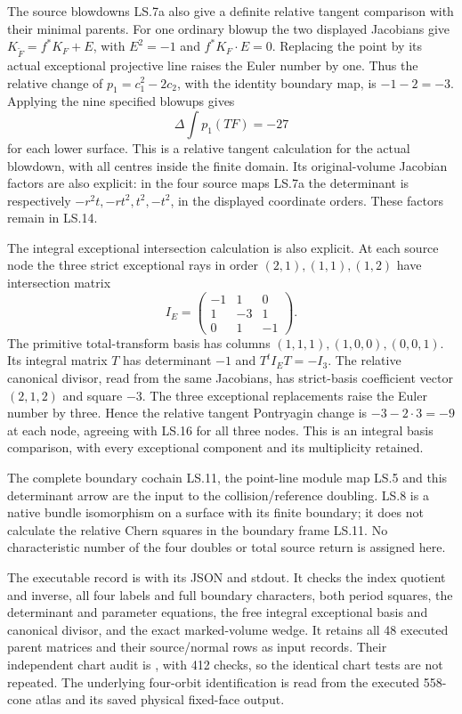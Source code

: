 The source blowdowns LS.7a also give a definite relative
tangent comparison with their minimal parents. For one
ordinary blowup the two displayed Jacobians give
\(K_{\widetilde F}=f^*K_F+E\), with \(E^2=-1\)
and \(f^*K_F\cdot E=0\). Replacing the point by its
actual exceptional projective line raises the Euler
number by one. Thus the relative change of
\(p_1=c_1^2-2c_2\), with the identity boundary map,
is \(-1-2=-3\). Applying the nine specified blowups
gives
\[
 \Delta\!\int p_1(TF)=-27
 \tag{LS.16}
\]
for each lower surface. This is a relative tangent
calculation for the actual blowdown, with all centres
inside the finite domain. Its original-volume
Jacobian factors are also explicit: in the four
source maps LS.7a the determinant is respectively
\(-r^2t, -rt^2, t^2,-t^2\), in the displayed
coordinate orders. These factors remain in LS.14.

The integral exceptional intersection calculation is
also explicit. At each source node the three strict
exceptional rays in order \((2,1),(1,1),(1,2)\)
have intersection matrix
\[
 I_E=\begin{pmatrix}-1&1&0\\1&-3&1\\0&1&-1\end{pmatrix}.
 \tag{LS.17}
\]
The primitive total-transform basis has columns
\((1,1,1),(1,0,0),(0,0,1)\). Its integral matrix
\(T\) has determinant \(-1\) and
\(T^tI_ET=-I_3\). The relative canonical divisor,
read from the same Jacobians, has strict-basis
coefficient vector \((2,1,2)\) and square \(-3\).
The three exceptional replacements raise the Euler
number by three. Hence the relative tangent
Pontryagin change is \(-3-2\cdot3=-9\) at
each node, agreeing with LS.16 for all three nodes.
This is an integral basis comparison, with every
exceptional component and its multiplicity retained.

The complete boundary cochain LS.11, the point-line
module map LS.5 and this determinant arrow are the input
to the collision/reference doubling. LS.8 is a native
bundle isomorphism on a surface with its finite boundary;
it does not calculate the relative Chern squares in the
boundary frame LS.11. No characteristic number of the
four doubles or total source return is assigned here.

The executable record is
 with its
JSON and stdout. It checks the index quotient and inverse,
all four labels and full boundary characters, both
period squares, the determinant and parameter equations,
the free integral exceptional basis and canonical
divisor, and the exact marked-volume wedge. It retains
all 48 executed parent matrices and their source/normal
rows as input records. Their independent chart audit
is , with
412 checks, so the identical chart tests are not
repeated. The underlying
four-orbit identification is read from the executed
558-cone atlas and its saved physical fixed-face output.

